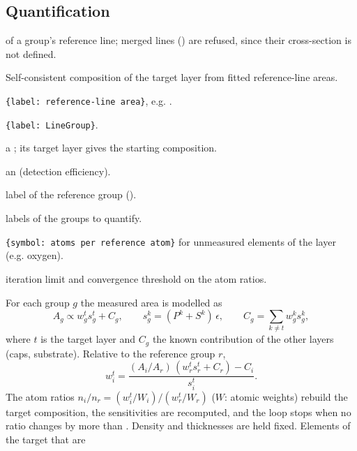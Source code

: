 \subsection{Quantification}

 of a group's reference line; merged lines () are
refused, since their cross-section is not defined.

Self-consistent composition of the target layer from fitted reference-line areas.
\begin{args}
\item[areas] \texttt{\{label: reference-line area\}}, e.g. .
\item[groups] \texttt{\{label: LineGroup\}}.
\item[matrix] a ; its target layer gives the starting composition.
\item[detector] an  (detection efficiency).
\item[reference] label of the reference group ().
\item[analytes] labels of the groups to quantify.
\item[fixed\_atoms] \texttt{\{symbol: atoms per reference atom\}} for unmeasured elements of the
  layer (e.g. oxygen).
\item[max\_iter, tol] iteration limit and convergence threshold on the atom ratios.
\end{args}
 For each group $g$ the measured area is modelled as
\begin{equation}
  A_g \propto w_g^t s_g^t + C_g, \qquad s_g^k = (P^k+S^k)\,\epsilon, \qquad
  C_g = \sum_{k\neq t} w_g^k s_g^k ,
\end{equation}
where $t$ is the target layer and $C_g$ the known contribution of the other layers (caps,
substrate). Relative to the reference group $r$,
\begin{equation}
  w_i^t = \frac{(A_i/A_r)\,(w_r^t s_r^t + C_r) - C_i}{s_i^t} .
\end{equation}
The atom ratios $n_i/n_r = (w_i^t/W_i)/(w_r^t/W_r)$ ($W$: atomic weights) rebuild the target
composition, the sensitivities are recomputed, and the loop stops when no ratio changes by
more than . Density and thicknesses are held fixed. Elements of the target that are
